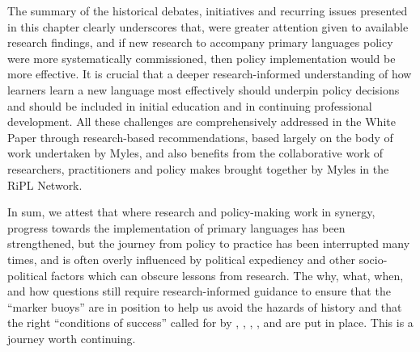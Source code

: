 \documentclass[output=paper]{langscibook}
\begin{document}
The summary of the historical debates, initiatives and recurring issues presented in this chapter clearly underscores that, were greater attention given to available research findings, and if new research to accompany primary languages policy were more systematically commissioned, then policy implementation would be more effective. It is crucial that a deeper research-informed understanding of how learners learn a new language most effectively should underpin policy decisions and should be included in initial education and in continuing professional development. All these challenges are comprehensively addressed in the White Paper through research-based recommendations, based largely on the body of work undertaken by Myles, and also benefits from the collaborative work of researchers, practitioners and policy makes brought together by Myles in the RiPL Network. 

In sum, we attest that where research and policy-making work in synergy, progress towards the implementation of primary languages has been strengthened, but the journey from policy to practice has been interrupted many times, and is often overly influenced by political expediency and other socio-political factors which can obscure lessons from research. The why, what, when, and how questions still require research-informed guidance to ensure that the ``marker buoys'' are in position to help us avoid the hazards of history and that the right ``conditions of success'' called for by \citealt{Leathes1918}, \citealt{Annan1962}, \citealt{Plowden1967}, \citealt{MuijsEtAl2005}, \citealt{CableEtAl2010} and \citealt{HolmesMyles2019} are put in place. This is a journey worth continuing. 

\sloppy\printbibliography[heading=subbibliography,notkeyword=this]
\end{document}
